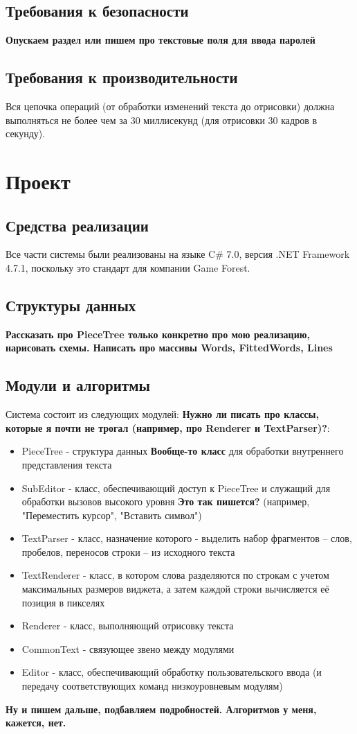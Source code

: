 \documentclass{fefu}
\begin{document}
		\subsection{Требования к безопасности}
			\textbf{Опускаем раздел или пишем про текстовые поля для ввода паролей}
		\subsection{Требования к производительности}
			Вся цепочка операций (от обработки изменений текста до 
			отрисовки) должна выполняться не более чем за 30 миллисекунд (для отрисовки 30 
			кадров в секунду).
	\section{Проект}
		\subsection{Средства реализации}
			Все части системы были реализованы на языке C\# 7.0, 
			версия .NET Framework 4.7.1, поскольку это стандарт для компании Game Forest.
		\subsection{Структуры данных}
			\textbf{Рассказать про PieceTree только конкретно про мою реализацию, нарисовать 
			схемы. Написать про массивы Words, FittedWords, Lines}
		\subsection{Модули и алгоритмы}
		\par Система состоит из следующих модулей: \textbf{Нужно ли писать про классы, которые я почти не 
		трогал (например, про Renderer и TextParser)?}:
		\begin{itemize}
			\item PieceTree - структура данных \textbf{Вообще-то класс} для обработки 
			внутреннего представления текста
			\item SubEditor - класс, обеспечивающий доступ к PieceTree и служащий для 
			обработки вызовов высокого уровня \textbf{Это так пишется?} (например, 
			"Переместить курсор", "Вставить символ")
			\item TextParser - класс, назначение которого - выделить набор фрагментов -- слов, 
			пробелов, переносов строки -- из исходного текста
			\item TextRenderer - класс, в котором слова разделяются по строкам с учетом 
			максимальных размеров виджета, а затем каждой строки вычисляется её позиция 
			в пикселях
			\item Renderer - класс, выполняющий отрисовку текста
			\item CommonText - связующее звено между модулями
			\item Editor - класс, обеспечивающий обработку пользовательского ввода (и 
			передачу соответствующих команд низкоуровневым модулям)
		\end{itemize}
		\textbf{Ну и пишем дальше, подбавляем подробностей. Алгоритмов у меня, кажется, нет.}
\end{document}
